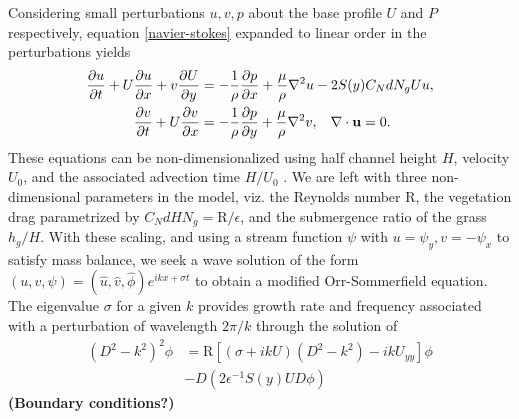 \documentclass[aps,prl,twocolumn,showpacs,superscriptaddress,groupedaddress,10pt]{revtex4-1}  %
\newcommand{\bu}{\mathbf{u}}
\newcommand{\del}{\partial}
\newcommand{\Rey}{\text{R}}
\newcommand{\shreyas}[1]{{\bf (#1)}}
\begin{document}
Considering small perturbations $u, v, p$ about the base profile $U$ and $P$ respectively, equation \eqref{navier-stokes} expanded to linear order in the perturbations yields
\begin{equation}
\begin{split}
\frac{\del u}{\del t}+U\frac{\del u}{\del x}+v\frac{\del U}{\del y} &= -\frac{1}{\rho}\frac{\del p}{\del x}+\frac{\mu}{\rho}\nabla^2u-2S(y) C_{N}dN_{g}Uu, \\
\frac{\del v}{\del  t}+ U\frac{\del v}{\del x} &= -\frac{1}{\rho}\frac{\del p}{\del y}+\frac{\mu}{\rho}\nabla^2v, \hspace{0.3cm} \nabla\cdot\bu=0.
\end{split}
\end{equation}
These equations can be non-dimensionalized using half channel height $H$, velocity $U_0$, and the associated advection time $H/U_0$ . 
We are left with three non-dimensional parameters in the model, viz. the Reynolds number $\Rey$, the vegetation drag parametrized by $C_N d H N_g = \Rey/\epsilon$, 
and the submergence ratio of the grass $h_g/H$. With these scaling, and using a stream function $\psi$ with $u = \psi_{y}, v= -\psi_x$ to satisfy mass balance, we seek a wave solution of the form $\left(u,v,\psi \right)= \left(\hat u, \hat v, \hat\phi \right)e^{ikx+\sigma t}$ to  obtain a modified Orr-Sommerfield equation. The eigenvalue $\sigma$ for a given $k$ provides growth rate and frequency associated with a perturbation of wavelength $2\pi/k$ through the solution of
\begin{equation}
\begin{split}
\left(D^2 -k^{2} \right)^2\phi &= \Rey \left[ \left({\sigma}+ikU\right) \left(D^2-k^2\right) -ikU_{yy}\right]\phi \\
&-D\left(2\epsilon^{-1} S(y) U D \phi\right)
\label{Orr-somerfield}
\end{split}
\end{equation}
\shreyas{Boundary conditions?}
\end{document}
